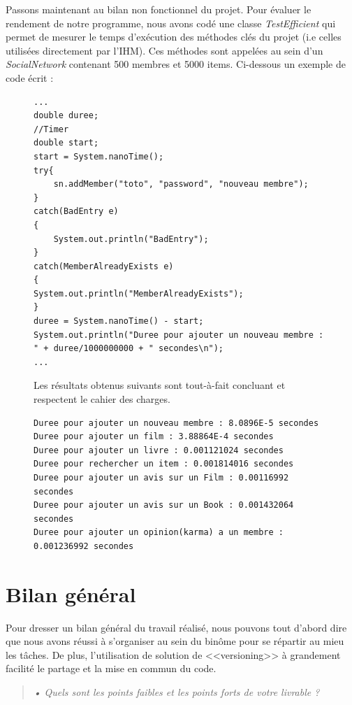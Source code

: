 \documentclass[12pt,a4paper]{report}
\begin{document}
Passons maintenant au bilan non fonctionnel du projet. Pour évaluer le rendement de notre programme,
nous avons codé une classe \emph{TestEfficient} qui permet de mesurer le temps d'exécution des méthodes clés du projet (i.e celles utilisées directement par l'IHM). Ces méthodes sont appelées au sein d'un \emph{SocialNetwork} contenant 500 membres et 5000 items. Ci-dessous un exemple de code écrit :

\begin{figure}
\begin{lstlisting}[caption = Code de rendement d'une fonction]
...
double duree;
//Timer
double start;
start = System.nanoTime();
try{
	sn.addMember("toto", "password", "nouveau membre");
}
catch(BadEntry e)
{
	System.out.println("BadEntry");
}
catch(MemberAlreadyExists e)
{
System.out.println("MemberAlreadyExists");
}
duree = System.nanoTime() - start;
System.out.println("Duree pour ajouter un nouveau membre : " + duree/1000000000 + " secondes\n");
...
\end{lstlisting} 
Les résultats obtenus suivants sont tout-à-fait concluant et respectent le cahier des charges.
\begin{lstlisting}[caption = Resultats obtenus]
Duree pour ajouter un nouveau membre : 8.0896E-5 secondes
Duree pour ajouter un film : 3.88864E-4 secondes
Duree pour ajouter un livre : 0.001121024 secondes
Duree pour rechercher un item : 0.001814016 secondes
Duree pour ajouter un avis sur un Film : 0.00116992 secondes
Duree pour ajouter un avis sur un Book : 0.001432064 secondes
Duree pour ajouter un opinion(karma) a un membre : 0.001236992 secondes
\end{lstlisting}
\end{figure}

\chapter*{Bilan général}
\label{chapter:Bilan général} %
Pour dresser un bilan général du travail réalisé, nous pouvons tout d'abord dire que nous avons réussi à s'organiser au sein du binôme pour se répartir au mieu les tâches. De plus, l'utilisation de solution de <<versioning>> à grandement facilité le partage et la mise en commun du code.
\begin{quotation}
\textit{• Quels sont les points faibles et les points forts de votre livrable ?}
\end{quotation}
\end{document}
